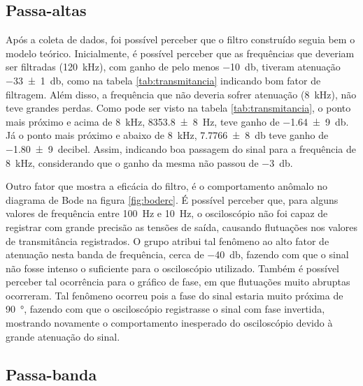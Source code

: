 \subsection{Passa-altas}

  Após a coleta de dados, foi possível perceber que o filtro construído seguia bem o modelo teórico. Inicialmente, é possível perceber que as frequências que deveriam ser filtradas (\SI{120}{\kilo\hertz}), com ganho de pelo menos \SI{-10}{\decibel}, tiveram atenuação \SI{-33(1)}{\decibel}, como na tabela \ref{tab:transmitancia} indicando bom fator de filtragem. Além disso, a frequência que não deveria sofrer atenuação (\SI{8}{\kilo\hertz}), não teve grandes perdas. Como pode ser visto na tabela \ref{tab:transmitancia}, o ponto mais próximo e acima de \SI{8}{\kilo\hertz}, \SI{8353,8(8)}{\hertz}, teve ganho de \SI{-1,64(9)}{\decibel}. Já o ponto mais próximo e abaixo de \SI{8}{\kilo\hertz}, \SI{7,7766(8)}{\decibel} teve ganho de \SI{-1,80(9)}{decibel}. Assim, indicando boa passagem do sinal para a frequência de \SI{8}{\kilo\hertz}, considerando que o ganho da mesma não passou de \SI{-3}{\decibel}.\par
  Outro fator que mostra a eficácia do filtro, é o comportamento anômalo no diagrama de Bode na figura \ref{fig:boderc}. É possível perceber que, para alguns valores de frequência entre \SI{100}{\hertz} e \SI{10}{\hertz}, o osciloscópio não foi capaz de registrar com grande precisão as tensões de saída, causando flutuações nos valores de transmitância registrados. O grupo atribui tal fenômeno ao alto fator de atenuação nesta banda de frequência, cerca de \SI{-40}{\decibel}, fazendo com que o sinal não fosse intenso o suficiente para o osciloscópio utilizado. Também é possível perceber tal ocorrência para o gráfico de fase, em que flutuações muito abruptas ocorreram. Tal fenômeno ocorreu pois a fase do sinal estaria muito próxima de \SI{90}{\degree}, fazendo com que o osciloscópio registrasse o sinal com fase invertida, mostrando novamente o comportamento inesperado do osciloscópio devido à grande atenuação do sinal.

\subsection{Passa-banda}

